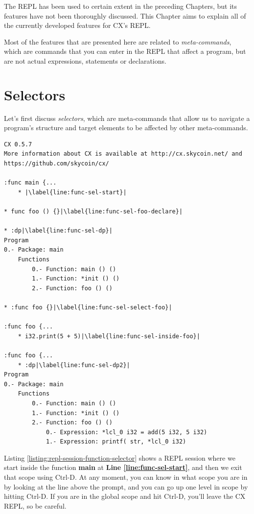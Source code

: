 \documentclass[11pt,fleqn,openany]{book} %
\begin{document}
The REPL has been used to certain extent in the preceding Chapters, but its features have not been thoroughly discussed. This Chapter aims to explain all of the currently developed features for CX's REPL.

Most of the features that are presented here are related to \emph{meta-commands}, which are commands that you can enter in the REPL that affect a program, but are not actual expressions, statements or declarations.

\section{Selectors}

Let's first discuss \emph{selectors}, which are meta-commands that allow us to navigate a program's structure and target elements to be affected by other meta-commands.

\begin{lstlisting}[caption={REPL function selection meta-command},captionpos=b,label={listing:repl-session-function-selector}]
CX 0.5.7
More information about CX is available at http://cx.skycoin.net/ and https://github.com/skycoin/cx/

:func main {...
	* |\label{line:func-sel-start}|

* func foo () {}|\label{line:func-sel-foo-declare}|

* :dp|\label{line:func-sel-dp}|
Program
0.- Package: main
	Functions
		0.- Function: main () ()
		1.- Function: *init () ()
		2.- Function: foo () ()

* :func foo {}|\label{line:func-sel-select-foo}|

:func foo {...
	* i32.print(5 + 5)|\label{line:func-sel-inside-foo}|
    
:func foo {...
	* :dp|\label{line:func-sel-dp2}|
Program
0.- Package: main
	Functions
		0.- Function: main () ()
		1.- Function: *init () ()
		2.- Function: foo () ()
			0.- Expression: *lcl_0 i32 = add(5 i32, 5 i32)
			1.- Expression: printf( str, *lcl_0 i32)
\end{lstlisting}

Listing \ref{listing:repl-session-function-selector} shows a REPL session where we start inside the function \textbf{main} at \textbf{Line \ref{line:func-sel-start}}, and then we exit that scope using Ctrl-D. At any moment, you can know in what scope you are in by looking at the line above the prompt, and you can go up one level in scope by hitting Ctrl-D. If you are in the global scope and hit Ctrl-D, you'll leave the CX REPL, so be careful.
\end{document}
